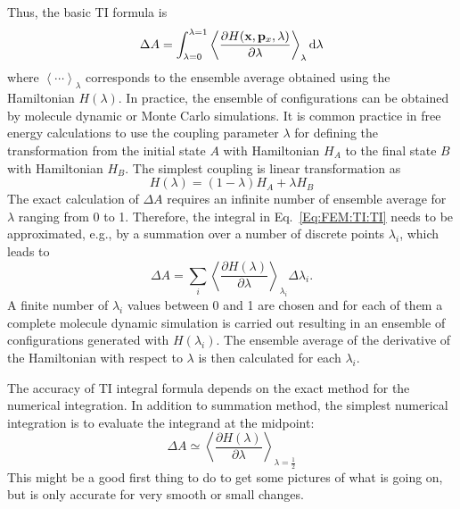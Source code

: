 Thus, the basic TI formula is
\begin{equation}
\Delta A = \int_{\lambda=0}^{\lambda=1}\left \langle \frac{\partial{H(\mathbf{x},\mathbf{p}_{x},\lambda)}}{\partial{\lambda}} \right \rangle_{\lambda} \mathop{}\!\mathrm{d}\lambda
\label{Eq:FEM:TI:TI}
\end{equation} 
where $\left \langle \cdots \right \rangle _{\lambda}$ corresponds to the ensemble average obtained using the Hamiltonian $H(\lambda)$. In practice, the ensemble of configurations can be obtained by molecule dynamic or Monte Carlo simulations. It is common practice in free energy calculations to use the coupling parameter $\lambda$ for defining the transformation from the initial state $A$ with Hamiltonian $H_{A}$ to the final state $B$ with Hamiltonian $H_{B}$. The simplest coupling is linear transformation as
\begin{equation}
H(\lambda) = (1-\lambda) H_{A} + \lambda H_{B}
\end{equation}
The exact calculation of $\Delta A$ requires an infinite number of ensemble average for $\lambda$ ranging from 0 to 1.
Therefore, the integral in Eq.~\ref{Eq:FEM:TI:TI} needs to be approximated, e.g., by a summation over a number of discrete points $\lambda_{i}$, which leads to 
\begin{equation}
\Delta A = \sum_{i}^{}\left \langle \frac{\partial{H(\lambda)}}{\partial{\lambda}} \right \rangle_{\lambda_{i}} \Delta\lambda_{i}.
\label{Eq:FEM:TI:dTI}
\end{equation} 
A finite number of $\lambda_{i}$ values between 0 and 1 are chosen and for each of them a complete molecule dynamic simulation is carried out resulting in an ensemble of configurations generated with $H(\lambda_{i})$.
The ensemble average of the derivative of the Hamiltonian with respect to $\lambda$ is then calculated for each $\lambda_{i}$.
	
The accuracy of TI integral formula depends on the exact method for the numerical integration.\cite{PaliwalJCTC2011} In addition to summation method, the simplest numerical integration is to evaluate the integrand at the midpoint:
\begin{equation}
\Delta A \simeq \left \langle \frac{\partial{H(\lambda)}}{\partial{\lambda}} \right \rangle_{\lambda=\frac{1}{2}}
\label{Eq:FEM:TI:TI1}
\end{equation} 
This might be a good first thing to do to get some pictures of what is going on, but is only accurate for very smooth or small changes. %
	
